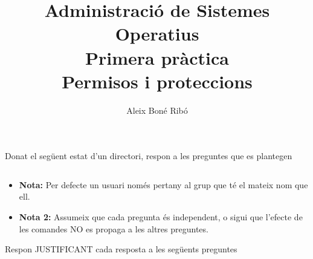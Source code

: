 \documentclass[12pt, oneside]{article}
\title{
    \bfseries
    Administració de Sistemes Operatius \\
    \Large
Primera pràctica \\
\large
Permisos i proteccions
}
\author{
Aleix Boné Ribó
}
\begin{document}
\maketitle

\begin{center}
Donat el següent estat d'un directori, respon a les preguntes que es plantegen
\end{center}

\inputminted{shell-session}{enunciat}

\begin{itemize}
    \item \textbf{Nota:} Per defecte un usuari només pertany al grup que té el mateix nom que ell.

    \item \textbf{Nota 2:} Assumeix que cada pregunta és independent, o sigui que l'efecte de les comandes NO es propaga a les altres preguntes.
\end{itemize}

\pagebreak

\begin{center}
    Respon JUSTIFICANT cada resposta a les següents preguntes
\end{center}
\end{document}
